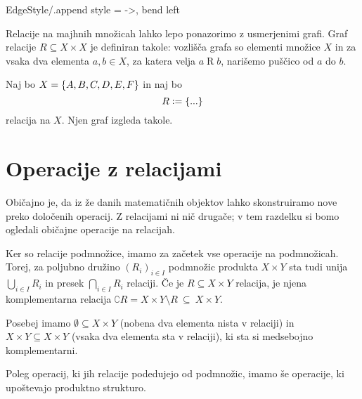 		\GraphInit[vstyle = Normal]
		\tikzset
		{
			EdgeStyle/.append style = {->, bend left}
		}
		
		Relacije na majhnih množicah lahko lepo ponazorimo z usmerjenimi grafi. Graf relacije $R \subseteq X \times X$ je definiran takole: vozlišča grafa so elementi množice $X$ in za vsaka dva elementa $a, b \in X$, za katera velja $a \mathrel{R} b$, narišemo puščico od $a$ do $b$.
		
		\begin{zgled}
			Naj bo $X = \set{A, B, C, D, E, F}$ in naj bo
			\[R \dfeq \set{...}\]
			relacija na $X$. Njen graf izgleda takole.
			\begin{center}
			\end{center}
		\end{zgled}
	
	
	\section{Operacije z relacijami}\label{RAZDELEK: Operacije z relacijami}
	
		Običajno je, da iz že danih matematičnih objektov lahko skonstruiramo nove preko določenih operacij. Z relacijami ni nič drugače; v tem razdelku si bomo ogledali običajne operacije na relacijah.
		
		Ker so relacije podmnožice, imamo za začetek vse operacije na podmnožicah. Torej, za poljubno družino $(R_i)_{i \in I}$ podmnožic produkta $X \times Y$ sta tudi unija $\bigcup_{i \in I} R_i$ in presek $\bigcap_{i \in I} R_i$ relaciji. Če je $R \subseteq X \times Y$ relacija, je njena komplementarna relacija $\complement{R} = X \times Y \setminus R \ \subseteq \ X \times Y$.
		
		Posebej imamo  $\emptyset \subseteq X \times Y$ (nobena dva elementa nista v relaciji) in  $X \times Y\subseteq X \times Y$ (vsaka dva elementa sta v relaciji), ki sta si medsebojno komplementarni.
		
		Poleg operacij, ki jih relacije podedujejo od podmnožic, imamo še operacije, ki upoštevajo produktno strukturo.
		
